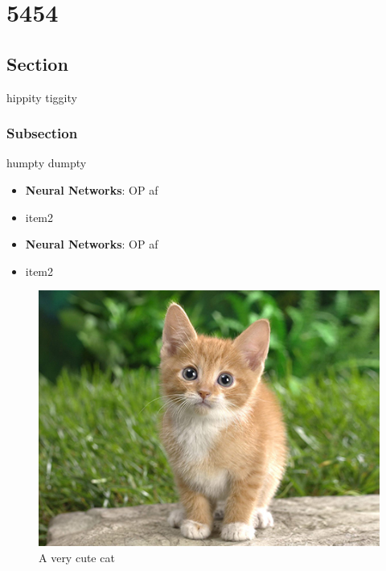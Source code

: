 \chapter{5454}
\section{Section}

hippity tiggity

\subsection{Subsection}

humpty dumpty

\begin{itemize}
\item \textbf{Neural Networks}: OP af
\item item2

\end{itemize}

\begin{itemize}
\item \textbf{Neural Networks}: OP af
\item item2

\end{itemize}

\begin{figure}[H]
\centering
\includegraphics[width=\textwidth,height=\textheight,keepaspectratio]{../static/media/cutecat.jpg}
\caption{A very cute cat}
\end{figure}

